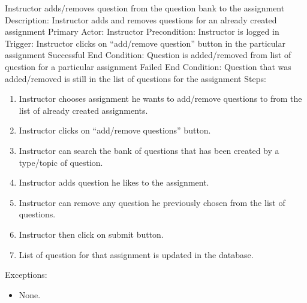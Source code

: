     \begin{section}{Instructor adds/removes question from the question bank to the assignment}
		Description: Instructor adds and removes questions for an already created assignment \newline
		Primary Actor: Instructor \newline
		Precondition:  Instructor is logged in \newline
		Trigger: Instructor clicks on “add/remove question” button in the particular assignment \newline
		Successful End Condition: Question is added/removed from list of question for a particular assignment \newline
		Failed End Condition: Question that was added/removed is still in the list of questions for the assignment \newline
		\newline
        Steps:
        \begin{enumerate}
            \item{Instructor chooses assignment he wants to add/remove questions to from the list of already created assignments.}
            \item{Instructor clicks on “add/remove questions” button.}
            \item{Instructor can search the bank of questions that has been created by a type/topic of question.}
            \item{Instructor adds question he likes to the assignment.}
            \item{Instructor can remove any question he previously chosen from the list of questions.}
            \item{Instructor then click on submit button.}
			\item{List of question for that assignment is updated in the database.}
        \end{enumerate}
        Exceptions:
        \begin{itemize}
            \item{None.}
        \end{itemize}
    \end{section}
    
